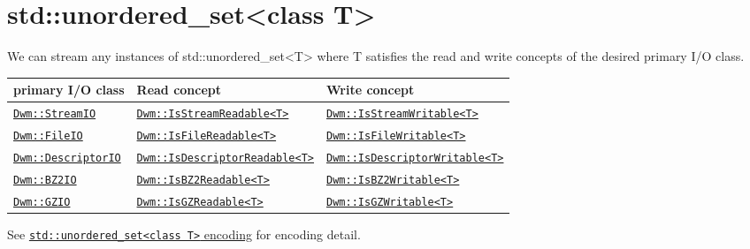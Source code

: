 \begin{minipage}{\textwidth}
\section{\ttfamily std::unordered\_set<class T>}
We can stream any instances of {\ttfamily std::unordered\_set<T>} where
{\ttfamily T} satisfies the read and write concepts of the desired
primary I/O class.
\vspace{1ex}

\begin{tabular}{lll}
  \textbf{primary I/O class} & \textbf{Read concept} & \textbf{Write concept} \\ \hline
  \hyperref[section:DwmStreamIOClass]{\texttt{Dwm::StreamIO}} & \hyperref[concept:DwmIsStreamReadable]{\texttt{Dwm::IsStreamReadable<T>}} & \hyperref[concept:DwmIsStreamWritable]{\texttt{Dwm::IsStreamWritable<T>}} \\
  \hyperref[section:DwmFileIOClass]{\texttt{Dwm::FileIO}} & \hyperref[concept:DwmIsFileReadable]{\texttt{Dwm::IsFileReadable<T>}} & \hyperref[concept:DwmIsFileWritable]{\texttt{Dwm::IsFileWritable<T>}} \\
  \hyperref[section:DwmDescriptorIOClass]{\texttt{Dwm::DescriptorIO}} & \hyperref[concept:DwmIsDescriptorReadable]{\texttt{Dwm::IsDescriptorReadable<T>}} & \hyperref[concept:DwmIsDescriptorWritable]{\texttt{Dwm::IsDescriptorWritable<T>}} \\
  \hyperref[section:DwmBZ2IOClass]{\texttt{Dwm::BZ2IO}} & \hyperref[concept:DwmIsBZ2Readable]{\texttt{Dwm::IsBZ2Readable<T>}} & \hyperref[concept:DwmIsBZ2Writable]{\texttt{Dwm::IsBZ2Writable<T>}} \\
  \hyperref[section:DwmGZIOClass]{\texttt{Dwm::GZIO}} & \hyperref[concept:DwmIsGZReadable]{\texttt{Dwm::IsGZReadable<T>}} & \hyperref[concept:DwmIsGZWritable]{\texttt{Dwm::IsGZWritable<T>}} \\
\end{tabular}
\vspace{1ex}

See \hyperref[encoding:stdUnorderedSet]{\texttt{std::unordered\_set<class T>} encoding} for encoding detail.
\end{minipage}

